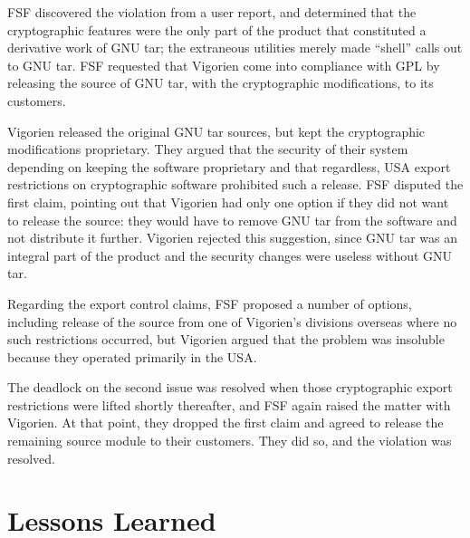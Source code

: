 \documentclass[12pt]{report}
\begin{document}
FSF discovered the violation from a user report, and determined that the
cryptographic features were the only part of the product that constituted
a derivative work of GNU tar; the extraneous utilities merely made
``shell'' calls out to GNU tar.  FSF requested that Vigorien come into
compliance with GPL by releasing the source of GNU tar, with the
cryptographic modifications, to its customers.

Vigorien released the original GNU tar sources, but kept the cryptographic
modifications proprietary.  They argued that the security of their system
depending on keeping the software proprietary and that regardless, USA
export restrictions on cryptographic software prohibited such a release.
FSF disputed the first claim, pointing out that Vigorien had only one
option if they did not want to release the source: they would have to
remove GNU tar from the software and not distribute it further.  Vigorien
rejected this suggestion, since GNU tar was an integral part of the
product and the security changes were useless without GNU tar.

Regarding the export control claims, FSF proposed a number of options,
including release of the source from one of Vigorien's divisions overseas
where no such restrictions occurred, but Vigorien argued that the problem
was insoluble because they operated primarily in the USA\@.

The deadlock on the second issue was resolved when those cryptographic
export restrictions were lifted shortly thereafter, and FSF again raised
the matter with Vigorien.  At that point, they dropped the first claim and
agreed to release the remaining source module to their customers.  They
did so, and the violation was resolved.


\section{Lessons Learned}
\end{document}
